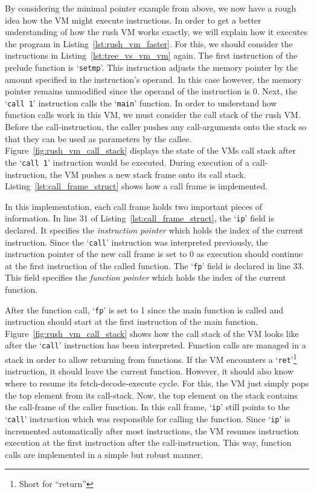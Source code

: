 By considering the minimal pointer example from above, we now have a rough idea how the VM might execute instructions.
In order to get a better understanding of how the rush VM works exactly, we will explain how it executes the program in Listing~\ref{lst:rush_vm_faster}.
For this, we should consider the instructions in Listing~\ref{lst:tree_vs_vm_vm} again.
The first instruction of the prelude function is `\texttt{setmp}'.
This instruction adjusts the memory pointer by the amount specified in the instruction's operand.
In this case however, the memory pointer remains unmodified since the operand of the instruction is 0.
Next, the `\texttt{call 1}' instruction calls the `\texttt{main}' function.
In order to understand how function calls work in this VM, we must consider the call stack of the rush VM\@.
Before the call-instruction, the caller pushes any call-arguments onto the stack so that they can be used as parameters by the callee.
Figure~\ref{fig:rush_vm_call_stack} displays the state of the VMs call stack after the `\texttt{call 1}' instruction would be executed.
During execution of a call-instruction, the VM pushes a new stack frame onto its call stack.
Listing~\ref{lst:call_frame_struct} shows how a call frame is implemented.


In this implementation, each call frame holds two important pieces of information.
In line 31 of Listing~\ref{lst:call_frame_struct}, the `\texttt{ip}' field is declared.
It specifies the \emph{instruction pointer} which holds the index of the current instruction.
Since the `\texttt{call}' instruction was interpreted previously, the instruction pointer of the new call frame is set to 0 as execution should continue at the first instruction of the called function.
The `\texttt{fp}' field is declared in line 33.
This field specifies the \emph{function pointer} which holds the index of the current function.

After the function call, `\texttt{fp}' is set to 1 since the main function is called and instruction should start at the first instruction of the main function.
Figure~\ref{fig:rush_vm_call_stack} shows how the call stack of the VM looks like after the `\texttt{call}' instruction has been interpreted.
Function calls are managed in a stack in order to allow returning from functions.
If the VM encounters a `\texttt{ret}'\footnote{Short for \enquote{return}} instruction, it should leave the current function.
However, it should also know where to resume its fetch-decode-execute cycle.
For this, the VM just simply pops the top element from its call-stack.
Now, the top element on the stack contains the call-frame of the caller function.
In this call frame, `\texttt{ip}' still points to the `\texttt{call}' instruction which was responsible for calling the function.
Since `\texttt{ip}' is incremented automatically after most instructions, the VM resumes instruction execution at the first instruction after the call-instruction.
This way, function calls are implemented in a simple but robust manner.


